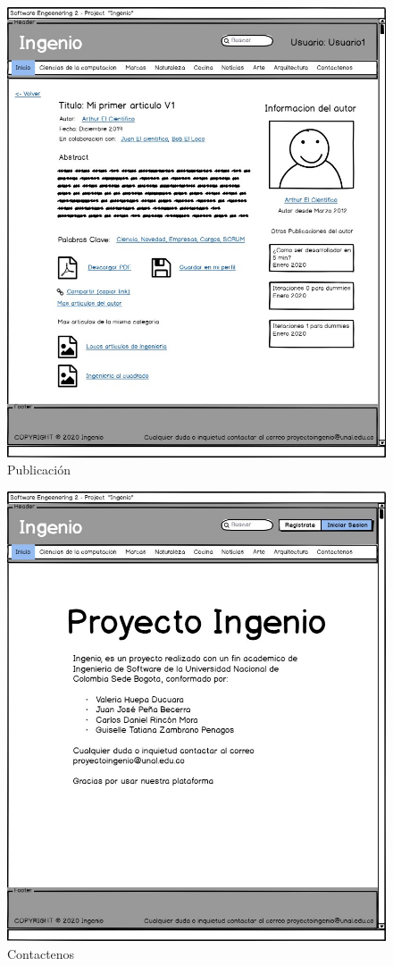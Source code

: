 \documentclass[a4paper,12 pt]{article}
\begin{document}
\begin{figure}[H]
    \centering
    \includegraphics[scale = 0.7]{images/Publicacion.jpg}
    \caption{Publicación}
    \label{F111}
\end{figure}{}

\begin{figure}[H]
    \centering
    \includegraphics[scale = 0.7]{images/Contactenos.jpg}
    \caption{Contactenos}
    \label{F112}
\end{figure}{}
\end{document}
